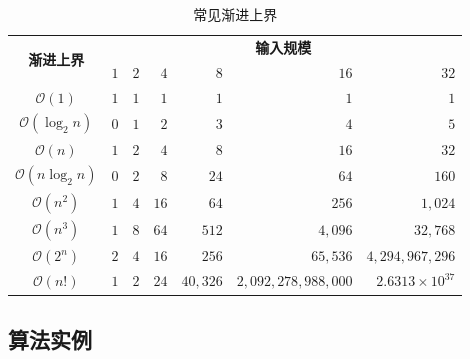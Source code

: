 \begin{frame}{\insertsubsectionhead}
	\begin{table}[h]
		\small
		\centering
		\caption{常见渐进上界}
		\begin{tabular}{c|rrrrrr}
			\toprule
			\multirow{2}{*}{\textbf{渐进上界}} & \multicolumn{6}{c}{\textbf{输入规模}}                                                                       \\
			                               & $1$                               & $2$ & $4$  & $8$      & $16$                & $32$                  \\
			\midrule
			$\mathcal{O}(1)$               & $1$                               & $1$ & $1$  & $1$      & $1$                 & $1$                   \\
			$\mathcal{O}(\log_{2}n)$       & $0$                               & $1$ & $2$  & $3$      & $4$                 & $5$                   \\
			$\mathcal{O}(n)$               & $1$                               & $2$ & $4$  & $8$      & $16$                & $32$                  \\
			$\mathcal{O}(n\log_{2}n)$      & $0$                               & $2$ & $8$  & $24$     & $64$                & $160$                 \\
			$\mathcal{O}(n^{2})$           & $1$                               & $4$ & $16$ & $64$     & $256$               & $1,024$               \\
			$\mathcal{O}(n^{3})$           & $1$                               & $8$ & $64$ & $512$    & $4,096$             & $32,768$              \\
			\midrule
			$\mathcal{O}(2^{n})$           & $2$                               & $4$ & $16$ & $256$    & $65,536$            & $4,294,967,296$       \\
			$\mathcal{O}(n!)$              & $1$                               & $2$ & $24$ & $40,326$ & $2,092,278,988,000$ & $2.6313\times10^{37}$ \\
			\bottomrule
		\end{tabular}
		\label{tab:asymptotic_upper_bound}
	\end{table}
\end{frame}

\subsection{算法实例}

